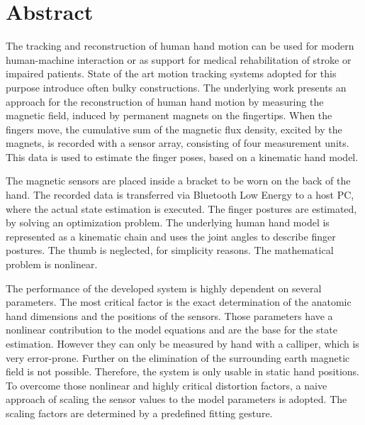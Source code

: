 
\chapter*{Abstract}

The tracking and reconstruction of human hand motion can be used for modern human-machine interaction or as support for medical rehabilitation of stroke or impaired patients. State of the art motion tracking systems adopted for this purpose introduce often bulky constructions.  
The underlying work presents an approach for the reconstruction of human hand motion by measuring the magnetic field, induced by permanent magnets on the fingertips. When the fingers move, the cumulative sum of the magnetic flux density, excited by the magnets, is recorded with a sensor array, consisting of four measurement units. This data is used to estimate the finger poses, based on a kinematic hand model. 

The magnetic sensors are placed inside a bracket to be worn on the back of the hand. The recorded data is transferred via Bluetooth Low Energy to a host PC, where the actual state estimation is executed. The finger postures are estimated, by solving an optimization problem. The underlying human hand model is represented as a kinematic chain and uses the joint angles to describe finger postures. The thumb is neglected, for simplicity reasons. The mathematical problem is nonlinear. 

The performance of the developed system is highly dependent on several parameters. The most critical factor is the exact determination of the anatomic hand dimensions and the positions of the sensors. Those parameters have a nonlinear contribution to the model equations and are the base for the state estimation. However they can only be measured by hand with a calliper, which is very error-prone. Further on the elimination of the surrounding earth magnetic field is not possible. Therefore, the system is only usable in static hand positions. To overcome those nonlinear and highly critical distortion factors, a naive approach of scaling the sensor values to the model parameters is adopted. The scaling factors are determined by a predefined fitting gesture.

